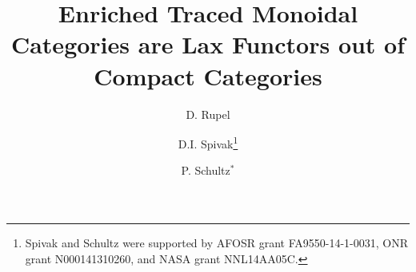 \documentclass[12pt,oneside,article,draft]{memoir}
\title{Enriched Traced Monoidal Categories are Lax Functors out of Compact Categories}
\author{
D. Rupel 
 \and 
D.I. Spivak\thanks{Spivak and Schultz were supported by AFOSR grant FA9550-14-1-0031, ONR grant N000141310260, and NASA grant NNL14AA05C.}
 \and 
 P. Schultz${}^*$%
 }
\begin{document}
\tightlists
\firmlists

\maketitle


\end{document}
